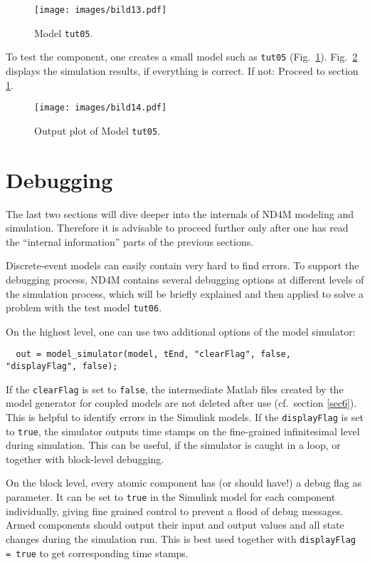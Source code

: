 \documentclass[12pt,oneside,a4paper,bibtotoc,BCOR=0pt,DIV=20]{scrreprt}
\newcommand{\cft}[1]{\mbox{\texttt{#1}}}   %
\newcommand{\defi}[1]{``#1''}
\begin{document}
\begin{figure}[ht]
\centering
\texttt{[image: images/bild13.pdf]}
\caption{Model \cft{tut05}.}
\label{fig_13}
\end{figure}

To test the component, one creates a small model such as \cft{tut05}
(Fig.\ \ref{fig_13}). Fig.\ \ref{fig_14} displays the simulation results, if
everything is correct. If not: Proceed to section \ref{sec8}.


\begin{figure}[ht]
\centering
\texttt{[image: images/bild14.pdf]}
\caption{Output plot of Model \cft{tut05}.}
\label{fig_14}
\end{figure}


\chapter{Debugging} \label{sec8}

The last two sections will dive deeper into the internals of ND4M modeling and
simulation. Therefore it is advisable to proceed further only after one has
read the \defi{internal information} parts of the previous sections.

Discrete-event models can easily contain very hard to find errors. To support
the debugging process, ND4M contains several debugging options at different
levels of the simulation process, which will be briefly explained and then
applied to solve a problem with the test model \cft{tut06}.

On the highest level, one can use two additional options of the model
simulator:
\begin{verbatim}
  out = model_simulator(model, tEnd, "clearFlag", false, "displayFlag", false);
\end{verbatim}
If the \cft{clearFlag} is set to \cft{false}, the intermediate Matlab files
created by the model generator for coupled models are not deleted after use
(cf.\ section \ref{sec6}). This is helpful to identify errors in the Simulink
models. If the \cft{displayFlag} is set to \cft{true}, the simulator outputs
time stamps on the fine-grained infinitesimal level during simulation. This can
be useful, if the simulator is caught in a loop, or together with block-level
debugging.

On the block level, every atomic component has (or should have!) a debug flag
as parameter. It can be set to \cft{true} in the Simulink model for each
component individually, giving fine grained control to prevent a flood of debug
messages.  Armed components should output their input and output values and all
state changes during the simulation run. This is best used together with
\cft{displayFlag = true} to get corresponding time stamps.
\end{document}
